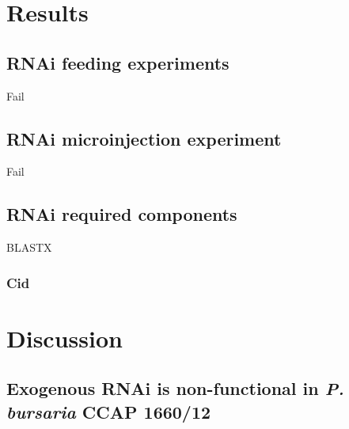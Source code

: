 \section{Results}

\subsection{RNAi feeding experiments}

Fail

\subsection{RNAi microinjection experiment}

Fail

\subsection{RNAi required components}

BLASTX



\subsubsection{Cid}






\section{Discussion}

\subsection{Exogenous RNAi is non-functional in \textit{P. bursaria} CCAP 1660/12}

